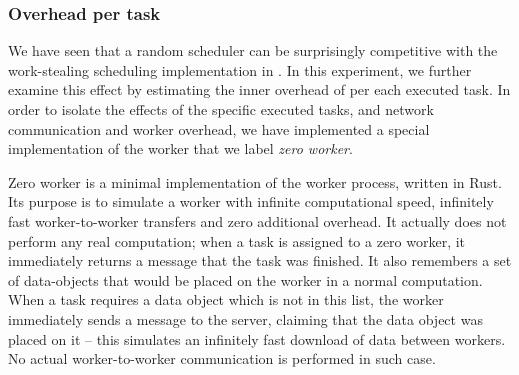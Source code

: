

\subsubsection*{Overhead per task}
\label{sec:dask-overhead-per-task}
We have seen that a random scheduler can be surprisingly competitive with the work-stealing
scheduling implementation in \dask{}. In this experiment, we further examine
this effect by estimating the inner overhead of \dask{} per each executed task.
In order to isolate the effects of the specific executed tasks, and network communication and
worker overhead, we have implemented a special implementation of the \dask{}
worker that we label \emph{zero worker}.

Zero worker is a minimal implementation of the \dask{} worker process, written
in Rust. Its purpose is to simulate a worker with infinite computational speed, infinitely fast
worker-to-worker transfers and zero additional overhead. It actually does not perform any real
computation; when a task is assigned to a zero worker, it immediately returns a message that the
task was finished. It also remembers a set of data-objects that would be placed on the worker in a
normal computation. When a task requires a data object which is not in this list, the worker
immediately sends a message to the server, claiming that the data object was placed on it -- this
simulates an infinitely fast download of data between workers. No actual worker-to-worker
communication is performed in such case.

